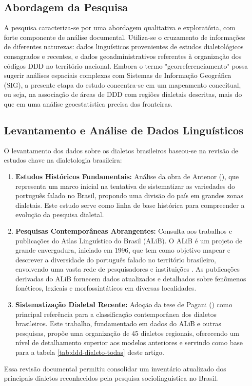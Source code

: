 \subsection{Abordagem da Pesquisa}


A pesquisa caracteriza-se por uma abordagem qualitativa e exploratória, com forte componente de análise documental. Utiliza-se o cruzamento de informações de diferentes naturezas: dados linguísticos provenientes de estudos dialetológicos consagrados e recentes, e dados geoadministrativos referentes à organização dos códigos DDD no território nacional. Embora o termo "georreferenciamento" possa sugerir análises espaciais complexas com Sistemas de Informação Geográfica (SIG), a presente etapa do estudo concentra-se em um mapeamento conceitual, ou seja, na associação de áreas de DDD com regiões dialetais descritas, mais do que em uma análise geoestatística precisa das fronteiras.

\subsection{Levantamento e Análise de Dados Linguísticos}


O levantamento dos dados sobre os dialetos brasileiros baseou-se na revisão de estudos chave na dialetologia brasileira:
\begin{enumerate}
    \item \textbf{Estudos Históricos Fundamentais:} Análise da obra de Antenor (\citeyear{nascentes1953}), que representa um marco inicial na tentativa de sistematizar as variedades do português falado no Brasil, propondo uma divisão do país em grandes zonas dialetais. Este estudo serve como linha de base histórica para compreender a evolução da pesquisa dialetal.
    \item \textbf{Pesquisas Contemporâneas Abrangentes:} Consulta aos trabalhos e publicações do Atlas Linguístico do Brasil (ALiB). O ALiB é um projeto de grande envergadura, iniciado em 1996, que tem como objetivo mapear e descrever a diversidade do português falado no território brasileiro, envolvendo uma vasta rede de pesquisadores e instituições \cite{cardoso2014alib, Aguilera2022}. As publicações derivadas do ALiB fornecem dados atualizados e detalhados sobre fenômenos fonéticos, lexicais e morfossintáticos em diversas localidades.
    \item \textbf{Sistematização Dialetal Recente:} Adoção da tese de Pagani (\citeyear{pagani2022}) como principal referência para a classificação contemporânea dos dialetos brasileiros. Este trabalho, fundamentado em dados do ALiB e outras pesquisas, propõe uma organização de 45 dialetos regionais, oferecendo um nível de detalhamento superior aos modelos anteriores e servindo como base para a tabela \ref{tab:ddd-dialeto-todas} deste artigo.
\end{enumerate}
Essa revisão documental permitiu consolidar um inventário atualizado dos principais dialetos reconhecidos pela pesquisa sociolinguística no Brasil.







